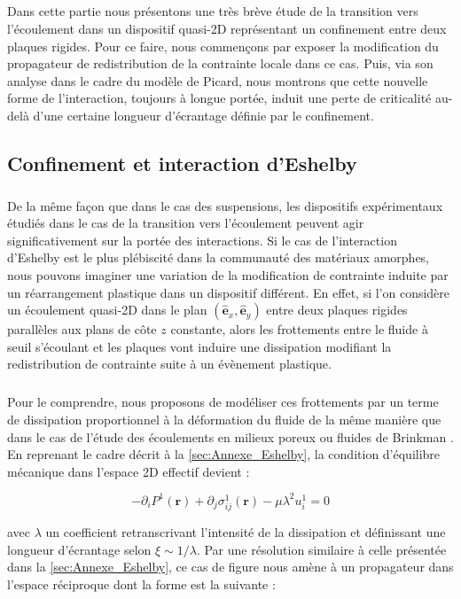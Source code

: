 \stoptocwriting

\label{sec:lambda_picard}

\subparagraph{}Dans cette partie nous présentons une très brève étude de la transition vers l'écoulement dans un dispositif quasi-2D représentant un confinement entre deux plaques rigides. Pour ce faire, nous commençons par exposer la modification du propagateur de redistribution de la contrainte locale dans ce cas. Puis, via son analyse dans le cadre du modèle de Picard, nous montrons que cette nouvelle forme de l'interaction, toujours à longue portée, induit une perte de criticalité au-delà d'une certaine longueur d'écrantage définie par le confinement.

\subsection{Confinement et interaction d'Eshelby}

\subparagraph{}De la même façon que dans le cas des suspensions, les dispositifs expérimentaux étudiés dans le cas de la transition vers l'écoulement peuvent agir significativement sur la portée des interactions. Si le cas de l'interaction d'Eshelby est le plus plébiscité dans la communauté des matériaux amorphes, nous pouvons imaginer une variation de la modification de contrainte induite par un réarrangement plastique dans un dispositif différent. En effet, si l'on considère un écoulement quasi-2D dans le plan $(\hat{\mathbf{e}}_x, \hat{\mathbf{e}}_y)$ entre deux plaques rigides parallèles aux plans de côte $z$ constante, alors les frottements entre le fluide à seuil s'écoulant et les plaques vont induire une dissipation modifiant la redistribution de contrainte suite à un évènement plastique. 

\subparagraph{}Pour le comprendre, nous proposons de modéliser ces frottements par un terme de dissipation proportionnel à la déformation du fluide de la même manière que dans le cas de l'étude des écoulements en milieux poreux \cite{long_note_2001} ou fluides de Brinkman \cite{brinkman_calculation_1949}. En reprenant le cadre décrit à la \autoref{sec:Annexe_Eshelby}, la condition d'équilibre mécanique dans l'espace 2D effectif devient :

\begin{equation}
	-\partial_i P^1(\mathbf{r}) + \partial_j\sigma_{ij}^1(\mathbf{r}) - \mu\lambda^2 u^1_{i}= 0
\end{equation}

\noindent avec $\lambda$ un coefficient retranscrivant l'intensité de la dissipation et définissant une longueur d'écrantage selon $\xi \sim 1/\lambda$. Par une résolution similaire à celle présentée dans la \autoref{sec:Annexe_Eshelby}, ce cas de figure nous amène à un propagateur dans l'espace réciproque dont la forme est la suivante :

